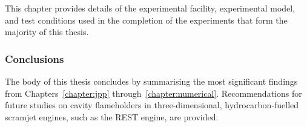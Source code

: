       This chapter provides details of the experimental facility, experimental model, and test conditions used in the completion of the experiments that form the majority of this thesis. 

    \subsubsection*{Conclusions}

      The body of this thesis concludes by summarising the most significant findings from Chapters~\ref{chapter:jpp} through~\ref{chapter:numerical}. Recommendations for future studies on cavity flameholders in three-dimensional, hydrocarbon-fuelled scramjet engines, such as the REST engine, are provided.
